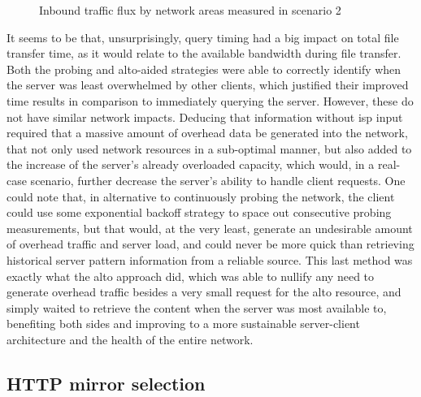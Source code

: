 \begin{figure}[H]
\caption{Inbound traffic flux by network areas measured in scenario 2}
\label{fig:graph-traffic-scenario2}
\end{figure}

    It seems to be that, unsurprisingly, query timing had a big impact on total file transfer time, as it would relate to the available bandwidth during file transfer.
    Both the probing and \gls{alto}-aided strategies were able to correctly identify when the server was least overwhelmed by other clients, which justified their improved time results in comparison to immediately querying the server.
    However, these do not have similar network impacts.
    Deducing that information without \gls{isp} input required that a massive amount of overhead data be generated into the network, that not only used network resources in a sub-optimal manner, but also added to the increase of the server's already overloaded capacity, which would, in a real-case scenario, further decrease the server's ability to handle client requests. 
    One could note that, in alternative to continuously probing the network, the client could use some exponential backoff strategy to space out consecutive probing measurements, but that would, at the very least, generate an undesirable amount of overhead traffic and server load, and could never be more quick than retrieving historical server pattern information from a reliable source.
    This last method was exactly what the \gls{alto} approach did, which was able to nullify any need to generate overhead traffic besides a very small request for the \gls{alto} resource, and simply waited to retrieve the content when the server was most available to, benefiting both sides and improving to a more sustainable server-client architecture and the health of the entire network.

\subsection{HTTP mirror selection}

